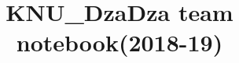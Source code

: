 \documentclass[10pt]{article}
\title{\vspace{-4ex}\Large{KNU\_DzaDza team notebook(2018-19)}}
\author{}
\date{}
\begin{document}
\begin{landscape}
\begin{multicols}{2}

\maketitle
\vspace{-13ex}
\tableofcontents
\pagestyle{fancy}



\end{multicols}
\end{landscape}
\end{document}
